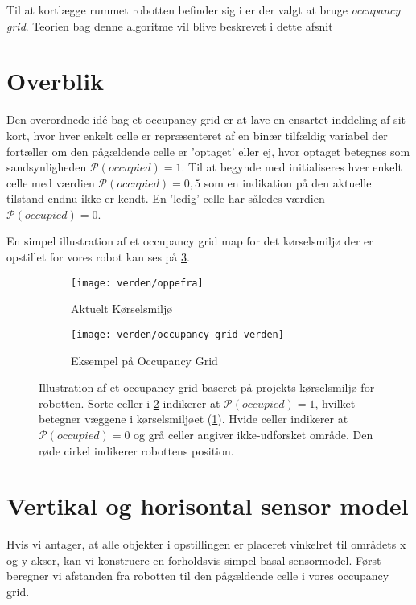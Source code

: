 Til at kortlægge rummet robotten befinder sig i er der valgt at bruge \textit{occupancy grid}.
Teorien bag denne algoritme vil blive beskrevet i dette afsnit

\section{Overblik}
Den overordnede idé bag et occupancy grid er at lave en ensartet inddeling af sit kort, hvor hver enkelt celle er repræsenteret af en binær tilfældig variabel der fortæller om den pågældende celle er 'optaget' eller ej, hvor optaget betegnes som sandsynligheden $\mathcal{P}(occupied) = 1$.
Til at begynde med initialiseres hver enkelt celle med værdien $\mathcal{P}(occupied) = 0,5$ som en indikation på den aktuelle tilstand endnu ikke er kendt.
En 'ledig' celle har således værdien $\mathcal{P}(occupied) = 0$.

En simpel illustration af et occupancy grid map for det kørselsmiljø der er opstillet for vores robot kan ses på \cref{map:approx_occupancy_grid}.

\begin{figure}[h] %
\centering
	\begin{subfigure}[b]{.45\textwidth}
	\centering
	\texttt{[image: verden/oppefra]}
	\caption{Aktuelt Kørselsmiljø}
	\label{map:world}
	\end{subfigure}
	\begin{subfigure}[b]{.45\textwidth}
	\centering
	\texttt{[image: verden/occupancy\_grid\_verden]}
	\caption{Eksempel på Occupancy Grid}
	\label{map:occupancy_grid}
	\end{subfigure}
\caption{Illustration af et occupancy grid baseret på projekts kørselsmiljø for robotten. Sorte celler i \cref{map:occupancy_grid} indikerer at $\mathcal{P}(occupied) = 1$, hvilket betegner væggene i kørselsmiljøet (\cref{map:world}). Hvide celler indikerer at $\mathcal{P}(occupied) = 0$ og grå celler angiver ikke-udforsket område. Den røde cirkel indikerer robottens position.}
\label{map:approx_occupancy_grid}
\end{figure}

\section{Vertikal og horisontal sensor model}
Hvis vi antager, at alle objekter i opstillingen er placeret vinkelret til områdets x og y akser,
kan vi konstruere en forholdsvis simpel basal sensormodel.
Først beregner vi afstanden fra robotten til den pågældende celle i vores occupancy grid.

